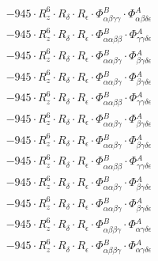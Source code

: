 \documentclass{article}
\begin{document}
\begin{subequations}
\begin{gather}
\begin{array}{c}
 \\[0.2em] 		 - 945 \cdot R_{z}^{6} \cdot R_{\delta{}} \cdot R_{\epsilon{}} \cdot \Phi{}^{B}_{\alpha{}\beta{}\gamma{}\gamma{}} \cdot \Phi{}^{A}_{\alpha{}\beta{}\delta{}\epsilon{}} 
 \\[0.2em] 		 - 945 \cdot R_{z}^{6} \cdot R_{\delta{}} \cdot R_{\epsilon{}} \cdot \Phi{}^{B}_{\alpha{}\alpha{}\beta{}\beta{}} \cdot \Phi{}^{A}_{\gamma{}\gamma{}\delta{}\epsilon{}} 
 \\[0.2em] 		 - 945 \cdot R_{z}^{6} \cdot R_{\delta{}} \cdot R_{\epsilon{}} \cdot \Phi{}^{B}_{\alpha{}\alpha{}\beta{}\gamma{}} \cdot \Phi{}^{A}_{\beta{}\gamma{}\delta{}\epsilon{}} 
 \\[0.2em] 		 - 945 \cdot R_{z}^{6} \cdot R_{\delta{}} \cdot R_{\epsilon{}} \cdot \Phi{}^{B}_{\alpha{}\alpha{}\beta{}\gamma{}} \cdot \Phi{}^{A}_{\beta{}\gamma{}\delta{}\epsilon{}} 
 \\[0.2em] 		 - 945 \cdot R_{z}^{6} \cdot R_{\delta{}} \cdot R_{\epsilon{}} \cdot \Phi{}^{B}_{\alpha{}\alpha{}\beta{}\beta{}} \cdot \Phi{}^{A}_{\gamma{}\gamma{}\delta{}\epsilon{}} 
 \\[0.2em] 		 - 945 \cdot R_{z}^{6} \cdot R_{\delta{}} \cdot R_{\epsilon{}} \cdot \Phi{}^{B}_{\alpha{}\alpha{}\beta{}\gamma{}} \cdot \Phi{}^{A}_{\beta{}\gamma{}\delta{}\epsilon{}} 
 \\[0.2em] 		 - 945 \cdot R_{z}^{6} \cdot R_{\delta{}} \cdot R_{\epsilon{}} \cdot \Phi{}^{B}_{\alpha{}\alpha{}\beta{}\gamma{}} \cdot \Phi{}^{A}_{\beta{}\gamma{}\delta{}\epsilon{}} 
 \\[0.2em] 		 - 945 \cdot R_{z}^{6} \cdot R_{\delta{}} \cdot R_{\epsilon{}} \cdot \Phi{}^{B}_{\alpha{}\alpha{}\beta{}\beta{}} \cdot \Phi{}^{A}_{\gamma{}\gamma{}\delta{}\epsilon{}} 
 \\[0.2em] 		 - 945 \cdot R_{z}^{6} \cdot R_{\delta{}} \cdot R_{\epsilon{}} \cdot \Phi{}^{B}_{\alpha{}\alpha{}\beta{}\gamma{}} \cdot \Phi{}^{A}_{\beta{}\gamma{}\delta{}\epsilon{}} 
 \\[0.2em] 		 - 945 \cdot R_{z}^{6} \cdot R_{\delta{}} \cdot R_{\epsilon{}} \cdot \Phi{}^{B}_{\alpha{}\alpha{}\beta{}\gamma{}} \cdot \Phi{}^{A}_{\beta{}\gamma{}\delta{}\epsilon{}} 
 \\[0.2em] 		 - 945 \cdot R_{z}^{6} \cdot R_{\delta{}} \cdot R_{\epsilon{}} \cdot \Phi{}^{B}_{\alpha{}\beta{}\beta{}\gamma{}} \cdot \Phi{}^{A}_{\alpha{}\gamma{}\delta{}\epsilon{}} 
 \\[0.2em] 		 - 945 \cdot R_{z}^{6} \cdot R_{\delta{}} \cdot R_{\epsilon{}} \cdot \Phi{}^{B}_{\alpha{}\beta{}\beta{}\gamma{}} \cdot \Phi{}^{A}_{\alpha{}\gamma{}\delta{}\epsilon{}} 

\end{array}
\end{gather}
\end{subequations}
\end{document}
